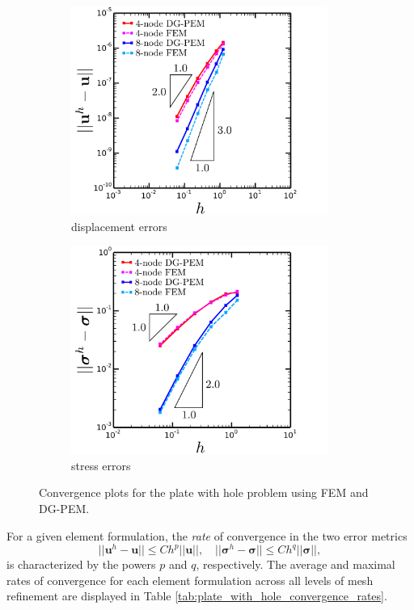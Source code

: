 \begin{figure}[!h]
  \centering
    \begin{subfigure}[b]{0.49\linewidth}
            \centering
            \includegraphics[width=3.3in]{figures/plate_with_hole_l2_errors.pdf}
    			\caption{displacement errors \label{fig:plate_with_hole_l2_errors}}
    \end{subfigure}
	\begin{subfigure}[b]{0.49\linewidth}
            \centering
            \includegraphics[width=3.3in]{figures/plate_with_hole_h1_errors.pdf}
    			\caption{stress errors \label{fig:plate_with_hole_h1_errors}}
    \end{subfigure} \caption{Convergence plots for the plate with hole problem using FEM and DG-PEM.}
  \label{fig:plate_with_hole_errors}
\end{figure}

For a given element formulation, the \textit{rate} of convergence in the two error metrics
\begin{equation}
	|| \mathbf{u}^h - \mathbf{u} || \leq C h^p || \mathbf{u} ||, \quad || \boldsymbol{\sigma}^h - \boldsymbol{\sigma} || \leq C h^q || \boldsymbol{\sigma} ||,
\end{equation}
is characterized by the powers $p$ and $q$, respectively. The average and maximal rates of convergence for each element formulation across all levels of mesh refinement are displayed in Table \ref{tab:plate_with_hole_convergence_rates}.

